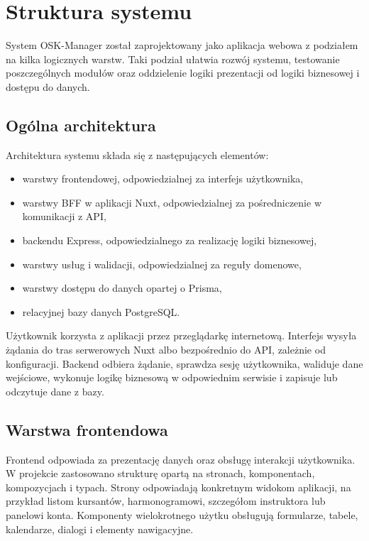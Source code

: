 \chapter{Struktura systemu}
\label{cha:struktura-systemu}

System OSK-Manager został zaprojektowany jako aplikacja webowa z podziałem na kilka logicznych warstw. Taki podział ułatwia rozwój systemu, testowanie poszczególnych modułów oraz oddzielenie logiki prezentacji od logiki biznesowej i dostępu do danych.

\section{Ogólna architektura}
\label{sec:ogolna-architektura}

Architektura systemu składa się z następujących elementów:
\begin{itemize}
    \item warstwy frontendowej, odpowiedzialnej za interfejs użytkownika,
    \item warstwy BFF w aplikacji Nuxt, odpowiedzialnej za pośredniczenie w komunikacji z API,
    \item backendu Express, odpowiedzialnego za realizację logiki biznesowej,
    \item warstwy usług i walidacji, odpowiedzialnej za reguły domenowe,
    \item warstwy dostępu do danych opartej o Prisma,
    \item relacyjnej bazy danych PostgreSQL.
\end{itemize}

Użytkownik korzysta z aplikacji przez przeglądarkę internetową. Interfejs wysyła żądania do tras serwerowych Nuxt albo bezpośrednio do API, zależnie od konfiguracji. Backend odbiera żądanie, sprawdza sesję użytkownika, waliduje dane wejściowe, wykonuje logikę biznesową w odpowiednim serwisie i zapisuje lub odczytuje dane z bazy.

\section{Warstwa frontendowa}
\label{sec:warstwa-frontendowa}

Frontend odpowiada za prezentację danych oraz obsługę interakcji użytkownika. W projekcie zastosowano strukturę opartą na stronach, komponentach, kompozycjach i typach. Strony odpowiadają konkretnym widokom aplikacji, na przykład listom kursantów, harmonogramowi, szczegółom instruktora lub panelowi konta. Komponenty wielokrotnego użytku obsługują formularze, tabele, kalendarze, dialogi i elementy nawigacyjne.

